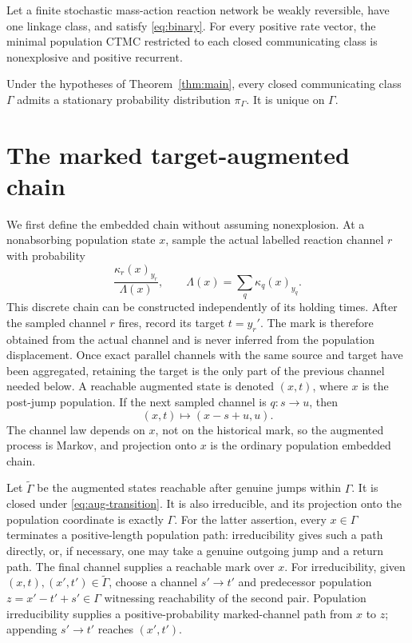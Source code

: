 \begin{theorem}\label{thm:main}
Let a finite stochastic mass-action reaction network be weakly reversible,
have one linkage class, and satisfy \eqref{eq:binary}.  For every positive
rate vector, the minimal population CTMC restricted to each closed
communicating class is nonexplosive and positive recurrent.
\end{theorem}

\begin{corollary}\label{cor:stationary}
Under the hypotheses of Theorem~\ref{thm:main}, every closed communicating
class \(\Gamma\) admits a stationary probability distribution
\(\pi_\Gamma\).  It is unique on \(\Gamma\).
\end{corollary}

\section{The marked target-augmented chain}\label{sec:marked}

We first define the embedded chain without assuming nonexplosion.  At a
nonabsorbing population state \(x\), sample the actual labelled reaction
channel \(r\) with probability
\begin{equation}\label{eq:channel-kernel}
  \frac{\kappa_r(x)_{y_r}}{\Lambda(x)},
  \qquad
  \Lambda(x)=\sum_q\kappa_q(x)_{y_q}.
\end{equation}
This discrete chain can be constructed independently of its holding times.
After the sampled channel \(r\) fires, record its target \(t=y_r'\).  The mark
is therefore obtained from the actual channel and is never inferred from the
population displacement.  Once exact parallel channels with the same source
and target have been aggregated, retaining the target is the only part of the
previous channel needed below.  A reachable augmented state is denoted
\((x,t)\), where \(x\) is the post-jump population.  If the next sampled
channel is \(q:s\to u\), then
\begin{equation}\label{eq:aug-transition}
  (x,t)\longmapsto(x-s+u,u).
\end{equation}
The channel law depends on \(x\), not on the historical mark, so the augmented
process is Markov, and projection onto \(x\) is the ordinary population
embedded chain.

Let \(\widetilde\Gamma\) be the augmented states reachable after genuine
jumps within \(\Gamma\).  It is closed under \eqref{eq:aug-transition}.  It is
also irreducible, and its projection onto the population coordinate is exactly
\(\Gamma\).  For the latter assertion, every \(x\in\Gamma\) terminates a
positive-length population path: irreducibility gives such a path directly,
or, if necessary, one may take a genuine outgoing jump and a return path.
The final channel supplies a reachable mark over \(x\).  For irreducibility,
given \((x,t),(x',t')\in\widetilde\Gamma\), choose
a channel \(s'\to t'\) and predecessor population
\(z=x'-t'+s'\in\Gamma\) witnessing reachability of the second pair.
Population irreducibility supplies a positive-probability marked-channel path
from \(x\) to \(z\); appending \(s'\to t'\) reaches \((x',t')\).

